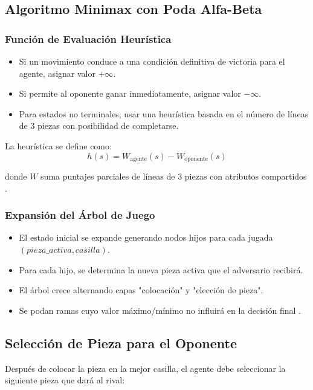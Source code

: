 \documentclass[conference]{IEEEtran}
\begin{document}
\subsection{Algoritmo Minimax con Poda Alfa-Beta}

\subsubsection{Función de Evaluación Heurística}
\begin{itemize}
\item Si un movimiento conduce a una condición definitiva de victoria para el agente, asignar valor $+\infty$.
\item Si permite al oponente ganar inmediatamente, asignar valor $-\infty$.
\item Para estados no terminales, usar una heurística basada en el número de líneas de 3 piezas con posibilidad de completarse.
\end{itemize}

La heurística se define como:
\begin{equation}
h(s) = W_{\text{agente}}(s) - W_{\text{oponente}}(s)
\end{equation}

donde $W$ suma puntajes parciales de líneas de 3 piezas con atributos compartidos \cite{santana2012}.

\subsubsection{Expansión del Árbol de Juego}
\begin{itemize}
\item El estado inicial se expande generando nodos hijos para cada jugada $(pieza\_activa, casilla)$.
\item Para cada hijo, se determina la nueva pieza activa que el adversario recibirá.
\item El árbol crece alternando capas "colocación" y "elección de pieza".
\item Se podan ramas cuyo valor máximo/mínimo no influirá en la decisión final \cite{russell2016}.
\end{itemize}

\subsection{Selección de Pieza para el Oponente}

Después de colocar la pieza en la mejor casilla, el agente debe seleccionar la siguiente pieza que dará al rival:
\end{document}
